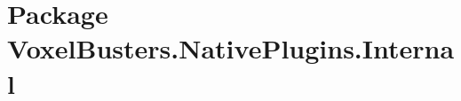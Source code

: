 \hypertarget{namespace_voxel_busters_1_1_native_plugins_1_1_internal}{}\section{Package Voxel\+Busters.\+Native\+Plugins.\+Internal}
\label{namespace_voxel_busters_1_1_native_plugins_1_1_internal}
